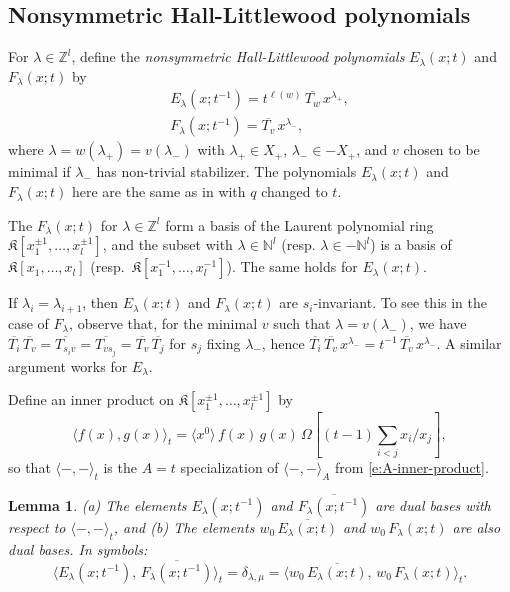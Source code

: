 \documentclass[12pt]{amsart}
\newtheorem{lemma}[thm]{Lemma}
\theoremstyle{definition}
\theoremstyle{remark}
\newcommand{\NN}{{\mathbb N}}
\newcommand{\ZZ}{{\mathbb Z}}
\newcommand{\Kfrak}{{\mathfrak K}}
\begin{document}
\subsection{Nonsymmetric Hall-Littlewood polynomials}
\label{ss:ns-HL-pols}

For $\lambda \in \ZZ ^{l}$, define the {\em nonsymmetric
Hall-Littlewood polynomials} $E_\lambda(x;t)$ and $F_\lambda(x;t)$ by
\begin{gather}\label{e:ns-HL-E}
E_{\lambda }(x;t^{-1}) = t^{\ell(w)}\, \overline{T_{w}}\,
x^{\lambda _{+}},\\
\label{e:ns-HL-F} F_{\lambda }(x;t^{-1}) = \overline{T_{v}}\,
x^{\lambda _{-}},
\end{gather}
where $\lambda =w(\lambda _{+}) = v(\lambda _{-})$ with
$\lambda_{+}\in X_{+}$, $\lambda _{-}\in -X_{+}$, and $v$ chosen to be
minimal if $\lambda _{-}$ has non-trivial stabilizer.  The polynomials
$E_\lambda(x;t)$ and $F_\lambda(x;t)$ here are the same as in \cite[\S
4.3]{BHMPS23} with $q$ changed to $t$.

The $F_{\lambda }(x;t)$ for $\lambda \in \ZZ^{l}$ form a basis of the
Laurent polynomial ring $\Kfrak [x_{1}^{\pm 1},\ldots,x_{l}^{\pm 1}]$,
and the subset with $\lambda\in \NN^l$ (resp.  $\lambda \in -\NN^l$)
is a basis of $\Kfrak [x_{1},\ldots,x_{l}]$ (resp.\ $\Kfrak
[x_{1}^{-1},\ldots,x_{l}^{-1}]$).  The same holds for $E_{\lambda
}(x;t)$.

If $\lambda _{i} = \lambda _{i+1}$, then
$E_{\lambda }(x;t)$ and $F_{\lambda }(x;t)$ are $s_{i}$-invariant.  To
see this in the case of $F_{\lambda }$, observe that, for the minimal
$v$ such that $\lambda =v(\lambda _{-})$, we have $\overline{T_{i}} \,
\overline{T_{v}} = \overline{T_{s_{i}v}} = \overline{T_{v s_{j}}} =
\overline{T_{v}}\, \overline{T_{j}}$ for $s_{j}$ fixing $\lambda
_{-}$, hence $\overline{T_{i}}\, \overline{T_{v}}\, x^{\lambda _{-}} =
t^{-1}\, \overline{T_{v}}\, x^{\lambda _{-}}$.  A similar argument
works for $E_{\lambda }$.

Define an inner product on $\Kfrak [x_{1}^{\pm 1},\ldots,x_{l}^{\pm 1}]$ by
\begin{equation}\label{e:t-inner}
\langle f(x),g(x) \rangle_{t} = \langle x^{0} \rangle\, f(x)\, g(x)\,
\Omega [(t-1)\sum _{i<j} x_{i}/x_{j}],
\end{equation}
so that $\langle - , -\rangle_t$ is the $A = t$ specialization of
$\langle - , - \rangle_A$ from \eqref{e:A-inner-product}.

\begin{lemma}\label{lem:t-dual-bases}
(a) The elements $E_{\lambda }(x;t^{-1})$ and $\overline{F_{\lambda
}(x;t^{-1})}$ are dual bases with respect to $\langle -,- \rangle
_{t}$, and (b) The elements $w_{0}\, \overline{E_{\lambda }(x;t)}$ and
$w_{0}\, F_{\lambda }(x;t)$ are also dual bases.  In symbols:
\begin{equation}\label{e:t-dual-bases}
\langle E_{\lambda }(x;t^{-1}),\, \overline{F_{\lambda }(x;t^{-1})}
\rangle_{t} = \delta _{\lambda ,\mu } = \langle w_{0}\,
\overline{E_{\lambda }(x;t)}, \, w_{0}\, F_{\lambda }(x;t)
\rangle_{t}.
\end{equation}
\end{lemma}
\end{document}
